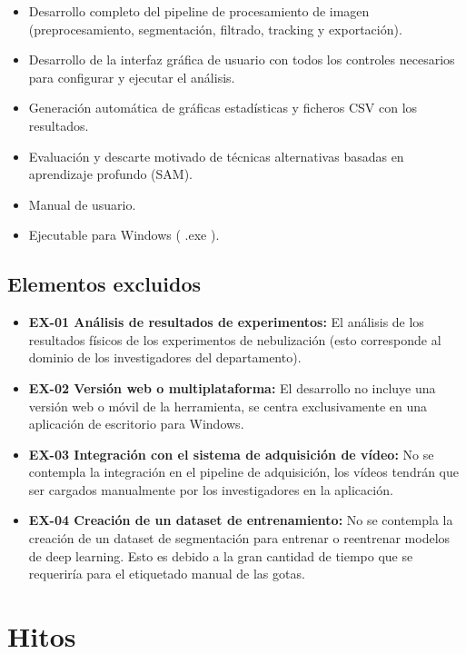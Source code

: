 \begin{itemize}
    \item Desarrollo completo del pipeline de procesamiento de imagen (preprocesamiento, segmentación, filtrado, tracking y exportación).
    \item Desarrollo de la interfaz gráfica de usuario con todos los controles necesarios para configurar y ejecutar el análisis.
    \item Generación automática de gráficas estadísticas y ficheros CSV con los resultados.
    \item Evaluación y descarte motivado de técnicas alternativas basadas en aprendizaje profundo (SAM).
    \item Manual de usuario.
    \item Ejecutable para Windows ( .exe ).
\end{itemize}

\subsection{Elementos excluidos}

\begin{itemize}
    \item \textbf{EX-01 Análisis de resultados de experimentos:} El análisis de los resultados físicos de los experimentos de nebulización (esto corresponde al dominio de los investigadores del departamento).
    \item \textbf{EX-02 Versión web o multiplataforma:} El desarrollo no incluye una versión web o móvil de la herramienta, se centra exclusivamente en una aplicación de escritorio para Windows.
    \item \textbf{EX-03 Integración con el sistema de adquisición de vídeo:} No se contempla la integración en el pipeline de adquisición, los vídeos tendrán que ser cargados manualmente por los investigadores en la aplicación.
    \item \textbf{EX-04 Creación de un dataset de entrenamiento:} No se contempla la creación de un dataset de segmentación para entrenar o reentrenar modelos de deep learning. Esto es debido a la gran cantidad de tiempo que se requeriría para el etiquetado manual de las gotas.
\end{itemize}


\section{Hitos}

